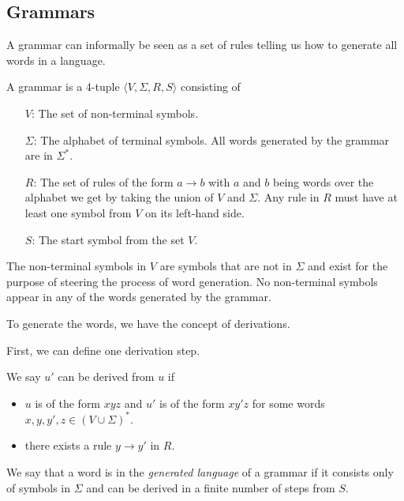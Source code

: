 \subsection{Grammars}\label{subsec:grammars}

A grammar can informally be seen as a set of rules telling us how to generate all words in a language.

\begin{define}[Grammar]
    A grammar is a 4-tuple $\langle V, \Sigma, R, S \rangle$ consisting of
    \begin{itemize}
        \item[$V$:] The set of non-terminal symbols.
        \item[$\Sigma$:] The alphabet of terminal symbols.
        All words generated by the grammar are in $\Sigma^{*}$.
        \item[$R$:] The set of rules of the form $a \to b$ with $a$ and $b$ being words over the alphabet we get by taking the union of $V$ and $\Sigma$.
        Any rule in $R$ must have at least one symbol from $V$ on its left-hand side.
        \item[$S$:] The start symbol from the set $V$.
    \end{itemize}
\end{define}

The non-terminal symbols in $V$ are symbols that are not in $\Sigma$ and exist for the purpose of steering the process of word generation.
No non-terminal symbols appear in any of the words generated by the grammar.

To generate the words, we have the concept of derivations.
\begin{define}[Derivation] %
    First, we can define one derivation step.

    We say $u'$ can be derived from $u$ if
    \begin{itemize}
        \setlength\itemsep{0.2em}
        \item $u$ is of the form $xyz$ and $u'$ is of the form $xy'z$ for some words $x, y, y', z \in (V \cup \Sigma)^*$.
        \item there exists a rule $y \to y'$ in $R$.
    \end{itemize}

    We say that a word is in the \emph{generated language} of a grammar if it consists only of symbols in $\Sigma$ and can be derived in a finite number of steps from $S$.
\end{define}

